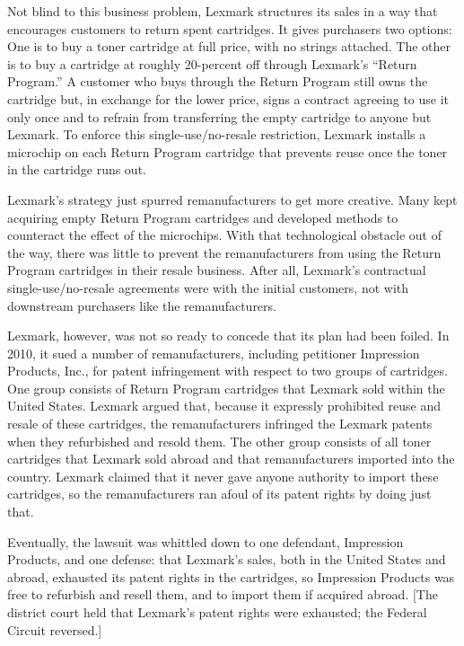 Not blind to this business problem, Lexmark structures its sales in a way that
encourages customers to return spent cartridges. It gives purchasers two
options: One is to buy a toner cartridge at full price, with no strings
attached. The other is to buy a cartridge at roughly 20-percent  off through
Lexmark's ``Return Program.'' A customer who buys through the Return Program
still owns the cartridge but, in exchange for the lower price, signs a contract
agreeing to use it only once and to refrain from transferring the empty
cartridge to anyone but Lexmark. To enforce this single-use/no-resale
restriction, Lexmark installs a microchip on each Return Program cartridge that
prevents reuse once the toner in the cartridge runs out.

Lexmark's strategy just spurred remanufacturers to get more creative. Many kept
acquiring empty Return Program cartridges and developed methods to counteract
the effect of the microchips. With that technological obstacle out of the way,
there was little to prevent the remanufacturers from using the Return Program
cartridges in their resale business. After all, Lexmark's contractual
single-use/no-resale agreements were with the initial customers, not with
downstream purchasers like the remanufacturers.

Lexmark, however, was not so ready to concede that its plan had been foiled. In
2010, it sued a number of remanufacturers, including petitioner Impression
Products, Inc., for patent infringement with respect to two groups of
cartridges. One group consists of Return Program cartridges that Lexmark sold
within the United States. Lexmark argued that, because it expressly prohibited
reuse and resale of these cartridges, the remanufacturers infringed the Lexmark
patents when they refurbished and resold them. The other group consists of all
toner cartridges that Lexmark sold abroad and that remanufacturers imported into
the country. Lexmark claimed that it never gave anyone authority to import these
cartridges, so the remanufacturers ran afoul of its patent rights by doing just
that.

Eventually, the lawsuit was whittled down to one defendant, Impression Products,
and one defense: that Lexmark's sales, both in the United States and abroad,
exhausted its patent rights in the cartridges, so Impression Products was free
to refurbish and resell them, and to import them if acquired abroad. [The
district court held that Lexmark's patent rights were exhausted; the Federal
Circuit reversed.]

